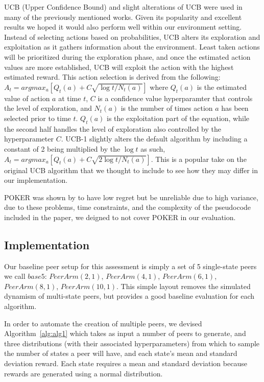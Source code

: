 \documentclass{article}
\begin{document}
UCB (Upper Confidence Bound) and slight alterations of UCB were used in many of the previously mentioned works. Given its popularity and excellent results we hoped it would also perform well within 
our environment setting. Instead of selecting actions based on probabilities, UCB alters its exploration and exploitation as it gathers information 
about the environment. Least taken actions will be prioritized during the exploration phase, and once the estimated action values are more established, UCB will exploit the 
action with the highest estimated reward. This action selection is derived from the following: $A_t = argmax_a \left[Q_t(a) + C \sqrt{\log{t} / N_t(a)}\right]$ where 
$Q_t(a)$ is the estimated value of action $a$ at time $t$, $C$ is a confidence value hyperparamter that controls the level of exploration, and $N_t(a)$ is the number of times 
action $a$ has been selected prior to time $t$. $Q_t(a)$ is the exploitation part of the equation, while the second half handles the level of exploration also controlled by
the hyperparameter $C$. UCB-1 slightly alters the default algorithm by including a constant of 2 being multiplied by the $\log{t}$ as such, $A_t = argmax_a 
\left[Q_t(a) + C \sqrt{2\log{t} / N_t(a)}\right]$. This is a popular take on the original UCB algorithm that we thought to include to see how they may differ in our 
implementation. 

POKER was shown by \cite{muMAB_wireless} to have low regret but be unreliable due to high variance, due to these problems, time constraints, and the complexity of the 
pseudocode included in the paper, we deigned to not cover POKER in our evaluation.


\subsection{Implementation}
Our baseline peer setup for this assessment is simply a set of 5 single-state peers we call $base5$: $PeerArm(2,1)$, $PeerArm(4,1)$, $PeerArm(6,1)$, $PeerArm(8,1)$, 
$PeerArm(10,1)$. This simple layout removes the simulated dynamism of multi-state peers, but provides a good baseline evaluation for each algorithm. 

In order to automate the creation of multiple peers, we devised Algorithm~\ref{alg:alg1} which takes as input a number of peers to generate, and three distributions (with 
their associated hyperparameters) from which to sample the number of states a peer will have, and each state's mean and standard deviation reward. Each state requires a 
mean and standard deviation because rewards are generated using a normal distribution. 
\end{document}
